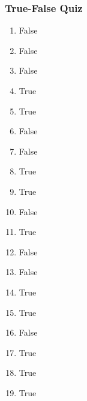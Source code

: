\documentclass{article}
\begin{document}
\subsubsection*{True-False Quiz}
\begin{enumerate}
  \item False
  \item False
  \item False
  \item True
  \item True
  \item False
  \item False
  \item True
  \item True
  \item False
  \item True
  \item False
  \item False
  \item True
  \item True
  \item False
  \item True
  \item True
  \item True
\end{enumerate}
\end{document}

